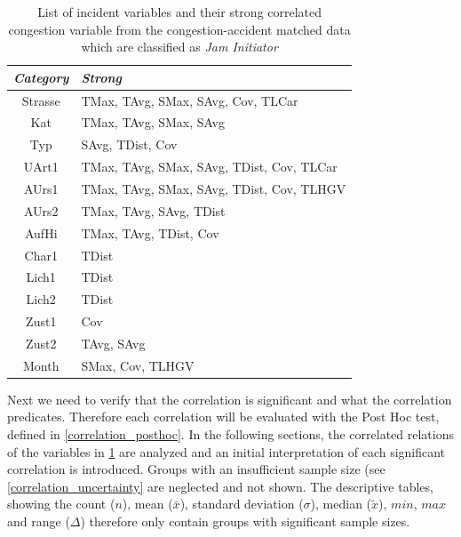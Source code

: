 \begin{table}[ht!]
	\centering
	\begin{tabular}{c|l}  
		\toprule
		\textit{Category} & \textit{Strong} \\
		\midrule
		Strasse & TMax, TAvg, SMax, SAvg, Cov, TLCar \\ 
 		Kat & TMax, TAvg, SMax, SAvg \\ %
 		Typ & SAvg, TDist, Cov \\  %
 		UArt1 & TMax, TAvg, SMax, SAvg, TDist, Cov, TLCar \\
 		AUrs1 & TMax, TAvg, SMax, SAvg, TDist, Cov, TLHGV \\ %
 		AUrs2 & TMax, TAvg, SAvg, TDist \\
 		AufHi & TMax, TAvg, TDist, Cov \\
 		Char1 & TDist \\ %
 		Lich1 & TDist \\
 		Lich2 & TDist \\ %
 		Zust1 & Cov \\
 		Zust2 & TAvg, SAvg \\ %
 		Month & SMax, Cov, TLHGV \\ %
 		\bottomrule
	\end{tabular}
	\caption{List of incident variables and their strong correlated congestion variable from the congestion-accident matched data which are classified as \textit{Jam Initiator}}
	\label{tbl:correlation_list_baysis_initiator}
\end{table}
Next we need to verify that the correlation is significant and what the correlation predicates. Therefore each correlation will be evaluated with the Post Hoc test, defined in \cref{correlation_posthoc}. In the following sections, the correlated relations of the variables in \cref{tbl:correlation_list_baysis_initiator} are analyzed and an initial interpretation of each significant correlation is introduced. Groups with an insufficient sample size (see \cref{correlation_uncertainty} are neglected and not shown. The descriptive tables, showing the count ($n$), mean ($\bar{x}$), standard deviation ($\sigma$), median ($\tilde{x}$), $min$, $max$ and range ($\Delta$) therefore only contain groups with significant sample sizes.

